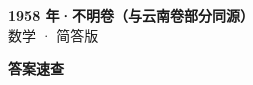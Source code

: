\documentclass[zihao=-4, a4paper]{ctexart}
\begin{document}
\begin{center}
  {\Large\bfseries 1958 年·不明卷（与云南卷部分同源）}\\[4pt]
  {\large 数学 · 简答版}
\end{center}
\medskip
{}

\clearpage
{}
\begin{center}{\Large\bfseries 答案速查}\end{center}
\medskip

\end{document}

